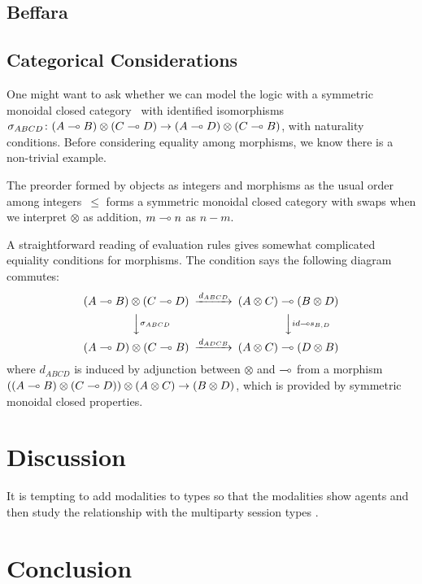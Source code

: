 \subsection{Beffara}

\subsection{Categorical Considerations}
One might want to ask whether we can model the logic with
a symmetric monoidal closed category~\citep{blute2004category}
  with identified isomorphisms
$\sigma_{ABCD}\colon (A\multimap B)\otimes (C\multimap D)\rightarrow (A\multimap D) \otimes
 (C\multimap B)$, with naturality conditions.
 Before considering equality among morphisms,
 we know there is a non-trivial example.
  \begin{example}
   The preorder formed by objects as integers and morphisms as the usual
   order among integers~$\le$
   forms a symmetric monoidal closed category with swaps
   when we interpret $\otimes$ as addition,
   $m \multimap n$ as $n-m$.
  \end{example}
A straightforward reading of evaluation rules gives somewhat complicated
equiality conditions for morphisms.
The condition says the following diagram commutes:
\[
   \begin{CD}
    (A\limp B)\otimes (C\limp D) @>{d_{ABCD}}>> (A\otimes C)\limp(B\otimes D)\\
    @VV{\sigma_{ABCD}}V @VV{id\limp s_{B,D}}V\\
    (A\limp D)\otimes (C\limp B) @>{d_{ADCB}}>> (A\otimes C)\limp (D\otimes B)
   \end{CD}
\]
where $d_{ABCD}$ is induced by adjunction between $\otimes$ and $\multimap$
 from a morphism
 $((A\multimap B)\otimes (C\multimap D))\otimes (A\otimes C)\rightarrow
 (B\otimes D)$, which is provided by symmetric monoidal closed properties.

\section{Discussion}

It is tempting to add modalities to types so that the
modalities show agents and then study the relationship with the
multiparty session types .



\section{Conclusion}




